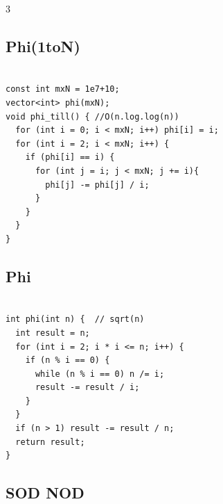 \documentclass[10pt, landscape, a4paper, onesided]{extarticle}
\begin{document}
\begin{multicols*}{3}
\subsection{Phi(1toN)}
\begin{verbatim}

const int mxN = 1e7+10;
vector<int> phi(mxN);
void phi_till() { //O(n.log.log(n))
  for (int i = 0; i < mxN; i++) phi[i] = i;
  for (int i = 2; i < mxN; i++) {
    if (phi[i] == i) {
      for (int j = i; j < mxN; j += i){
        phi[j] -= phi[j] / i;
      }
    }
  }
}
\end{verbatim}

\subsection{Phi}
\begin{verbatim}

int phi(int n) {  // sqrt(n)
  int result = n;
  for (int i = 2; i * i <= n; i++) {
    if (n % i == 0) {
      while (n % i == 0) n /= i;
      result -= result / i;
    }
  }
  if (n > 1) result -= result / n;
  return result;
}
\end{verbatim}

\subsection{SOD NOD}
\begin{verbatim}


\end{verbatim}
\end{multicols*}
\end{document}
